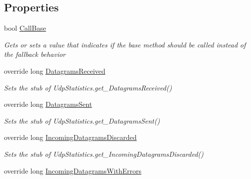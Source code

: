 \subsection*{Properties}
\begin{DoxyCompactItemize}
\item 
bool \hyperlink{class_system_1_1_net_1_1_network_information_1_1_fakes_1_1_stub_udp_statistics_a530d62e8fa5c9b0050570d94e007d89b}{Call\-Base}
\begin{DoxyCompactList}\small\item\em Gets or sets a value that indicates if the base method should be called instead of the fallback behavior\end{DoxyCompactList}\item 
override long \hyperlink{class_system_1_1_net_1_1_network_information_1_1_fakes_1_1_stub_udp_statistics_a01f11831573c1563ca62a7e464b5cea7}{Datagrams\-Received}
\begin{DoxyCompactList}\small\item\em Sets the stub of Udp\-Statistics.\-get\-\_\-\-Datagrams\-Received()\end{DoxyCompactList}\item 
override long \hyperlink{class_system_1_1_net_1_1_network_information_1_1_fakes_1_1_stub_udp_statistics_aecb1c31b4f1854ec9cfd938ec7668b28}{Datagrams\-Sent}
\begin{DoxyCompactList}\small\item\em Sets the stub of Udp\-Statistics.\-get\-\_\-\-Datagrams\-Sent()\end{DoxyCompactList}\item 
override long \hyperlink{class_system_1_1_net_1_1_network_information_1_1_fakes_1_1_stub_udp_statistics_a90906b68e392f122db82053ea55f9a45}{Incoming\-Datagrams\-Discarded}
\begin{DoxyCompactList}\small\item\em Sets the stub of Udp\-Statistics.\-get\-\_\-\-Incoming\-Datagrams\-Discarded()\end{DoxyCompactList}\item 
override long \hyperlink{class_system_1_1_net_1_1_network_information_1_1_fakes_1_1_stub_udp_statistics_aa47fd109ab535725cddaebaa934b3948}{Incoming\-Datagrams\-With\-Errors}

\end{DoxyCompactItemize}
